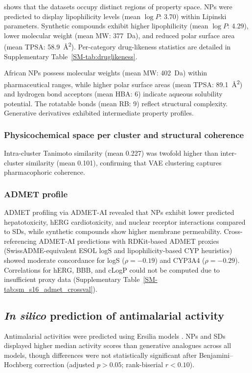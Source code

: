 \documentclass[journal=jcisd8,manuscript=article]{achemso}
\begin{document}
 shows that the datasets occupy distinct regions of property space. NPs were predicted to display lipophilicity levels (mean $\log P$: \num{3.70}) within Lipinski parameters. Synthetic compounds exhibit higher lipophilicity (mean $\log P$: \num{4.29}), lower molecular weight (mean MW: \qty{377}{\dalton}), and reduced polar surface area (mean TPSA: \qty{58.9}{\angstrom\squared}). Per-category drug-likeness statistics are detailed in Supplementary Table~\ref{SM-tab:druglikeness}.

African NPs possess molecular weights (mean MW: \qty{402}{\dalton}) within pharmaceutical ranges, while higher polar surface areas (mean TPSA: \qty{89.1}{\angstrom\squared}) and hydrogen bond acceptors (mean HBA: \num{6}) indicate aqueous solubility potential. The rotatable bonds (mean RB: \num{9}) reflect structural complexity. Generative derivatives exhibited intermediate property profiles.

\subsubsection{Physicochemical space per cluster and structural coherence}
Intra-cluster Tanimoto similarity (mean \num{0.227}) was twofold higher than inter-cluster similarity (mean \num{0.101}), confirming that VAE clustering captures pharmacophoric coherence.
\subsubsection{ADMET profile}

ADMET profiling via ADMET-AI \cite{Swanson2024} revealed that NPs exhibit lower predicted hepatotoxicity, hERG cardiotoxicity, and nuclear receptor interactions compared to SDs, while synthetic compounds show higher membrane permeability. Cross-referencing ADMET-AI predictions with RDKit-based ADMET proxies (SwissADME-equivalent ESOL logS and lipophilicity-based CYP heuristics) showed moderate concordance for logS ($\rho = -0.19$) and CYP3A4 ($\rho = -0.29$). Correlations for hERG, BBB, and cLogP could not be computed due to insufficient proxy data (Supplementary Table~\ref{SM-tab:sm_s16_admet_crossval}).

\subsection{\textit{In silico} prediction of antimalarial activity}

Antimalarial activities were predicted using Ersilia models \cite{Turon2025}. NPs and SDs displayed higher median activity scores than generative analogues across all models, though differences were not statistically significant after Benjamini--Hochberg correction (adjusted $p > \num{0.05}$; rank-biserial $r < \num{0.10}$).
\end{document}
